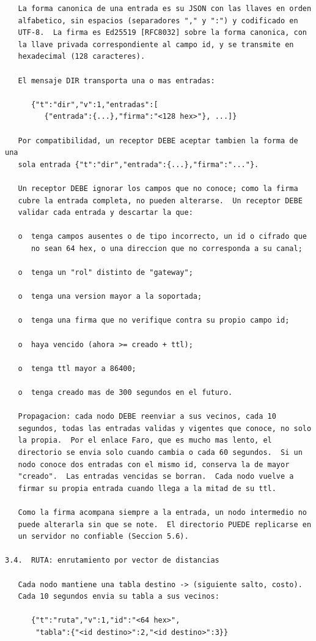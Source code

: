 \newpage
\begin{Verbatim}
   La forma canonica de una entrada es su JSON con las llaves en orden
   alfabetico, sin espacios (separadores "," y ":") y codificado en
   UTF-8.  La firma es Ed25519 [RFC8032] sobre la forma canonica, con
   la llave privada correspondiente al campo id, y se transmite en
   hexadecimal (128 caracteres).

   El mensaje DIR transporta una o mas entradas:

      {"t":"dir","v":1,"entradas":[
         {"entrada":{...},"firma":"<128 hex>"}, ...]}

   Por compatibilidad, un receptor DEBE aceptar tambien la forma de una
   sola entrada {"t":"dir","entrada":{...},"firma":"..."}.

   Un receptor DEBE ignorar los campos que no conoce; como la firma
   cubre la entrada completa, no pueden alterarse.  Un receptor DEBE
   validar cada entrada y descartar la que:

   o  tenga campos ausentes o de tipo incorrecto, un id o cifrado que
      no sean 64 hex, o una direccion que no corresponda a su canal;

   o  tenga un "rol" distinto de "gateway";

   o  tenga una version mayor a la soportada;

   o  tenga una firma que no verifique contra su propio campo id;

   o  haya vencido (ahora >= creado + ttl);

   o  tenga ttl mayor a 86400;

   o  tenga creado mas de 300 segundos en el futuro.

   Propagacion: cada nodo DEBE reenviar a sus vecinos, cada 10
   segundos, todas las entradas validas y vigentes que conoce, no solo
   la propia.  Por el enlace Faro, que es mucho mas lento, el
   directorio se envia solo cuando cambia o cada 60 segundos.  Si un
   nodo conoce dos entradas con el mismo id, conserva la de mayor
   "creado".  Las entradas vencidas se borran.  Cada nodo vuelve a
   firmar su propia entrada cuando llega a la mitad de su ttl.

   Como la firma acompana siempre a la entrada, un nodo intermedio no
   puede alterarla sin que se note.  El directorio PUEDE replicarse en
   un servidor no confiable (Seccion 5.6).

3.4.  RUTA: enrutamiento por vector de distancias

   Cada nodo mantiene una tabla destino -> (siguiente salto, costo).
   Cada 10 segundos envia su tabla a sus vecinos:

      {"t":"ruta","v":1,"id":"<64 hex>",
       "tabla":{"<id destino>":2,"<id destino>":3}}
\end{Verbatim}
